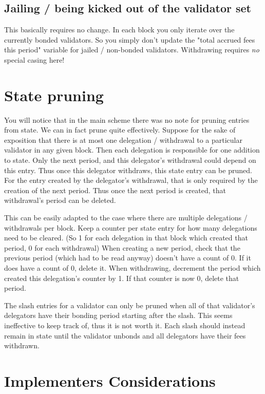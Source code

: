 \documentclass[]{article}
\begin{document}
\subsection{Jailing / being kicked out of the validator set}
This basically requires no change.
In each block you only iterate over the currently bonded validators.
So you simply don't update the "total accrued fees this period" variable for jailed / non-bonded validators.
Withdrawing requires \textit{no} special casing here!

\section{State pruning}
You will notice that in the main scheme there was no note for pruning entries from state.
We can in fact prune quite effectively.
Suppose for the sake of exposition that there is at most one delegation / withdrawal to a particular validator in any given block.
Then each delegation is responsible for one addition to state.
Only the next period, and this delegator's withdrawal could depend on this entry. Thus once this delegator withdraws, this state entry can be pruned.
For the entry created by the delegator's withdrawal, that is only required by the creation of the next period.
Thus once the next period is created, that withdrawal's period can be deleted.

This can be easily adapted to the case where there are multiple delegations / withdrawals per block.
Keep a counter per state entry for how many delegations need to be cleared.
(So 1 for each delegation in that block which created that period, 0 for each withdrawal)
When creating a new period, check that the previous period (which had to be read anyway) doesn't have a count of 0.
If it does have a count of 0, delete it.
When withdrawing, decrement the period which created this delegation's counter by 1.
If that counter is now 0, delete that period.

The slash entries for a validator can only be pruned when all of that validator's delegators have their bonding period starting after the slash.
This seems ineffective to keep track of, thus it is not worth it.
Each slash should instead remain in state until the validator unbonds and all delegators have their fees withdrawn.

\section{Implementers Considerations}
\end{document}
